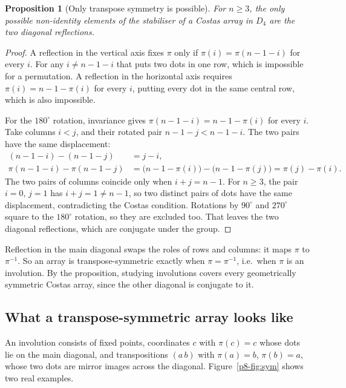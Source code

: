 \documentclass[11pt,a4paper,oneside]{report}
\newtheorem{proposition}[theorem]{Proposition}
\theoremstyle{definition}
\begin{document}
\begin{proposition}[Only transpose symmetry is possible]\label{p8-prop:onlytranspose}
For $n\ge3$, the only possible non-identity elements of the stabiliser of a Costas array in $D_4$ are the two diagonal reflections.
\end{proposition}
\begin{proof}
A reflection in the vertical axis fixes $\pi$ only if $\pi(i)=\pi(n-1-i)$ for every $i$. For any
$i\ne n-1-i$ that puts two dots in one row, which is impossible for a permutation. A reflection in
the horizontal axis requires $\pi(i)=n-1-\pi(i)$ for every $i$, putting every dot in the same
central row, which is also impossible.

For the $180^\circ$ rotation, invariance gives $\pi(n-1-i)=n-1-\pi(i)$ for every $i$. Take
columns $i<j$, and their rotated pair $n-1-j<n-1-i$. The two pairs have the same displacement:
\[
\begin{aligned}
(n-1-i)-(n-1-j) &= j-i,\\
\pi(n-1-i)-\pi(n-1-j) &= \bigl(n-1-\pi(i)\bigr)-\bigl(n-1-\pi(j)\bigr)=\pi(j)-\pi(i).
\end{aligned}
\]
The two pairs of columns coincide only when $i+j=n-1$. For $n\ge3$, the pair $i=0$, $j=1$ has
$i+j=1\ne n-1$, so two distinct pairs of dots have the same displacement, contradicting the Costas
condition. Rotations by $90^\circ$ and $270^\circ$ square to the $180^\circ$ rotation, so they are
excluded too. That leaves the two diagonal reflections, which are conjugate under the group.
\end{proof}

Reflection in the main diagonal swaps the roles of rows and columns: it maps $\pi$ to
$\pi^{-1}$. So an array is transpose-symmetric exactly when $\pi=\pi^{-1}$, i.e.\ when
$\pi$ is an involution. By the proposition, studying involutions covers every geometrically symmetric
Costas array, since the other diagonal is conjugate to it.

\subsection{What a transpose-symmetric array looks like}

An involution consists of fixed points, coordinates $c$ with $\pi(c)=c$ whose dots lie
on the main diagonal, and transpositions $(a\,b)$ with $\pi(a)=b$, $\pi(b)=a$, whose
two dots are mirror images across the diagonal. Figure~\ref{p8-fig:sym} shows two real examples.
\end{document}
